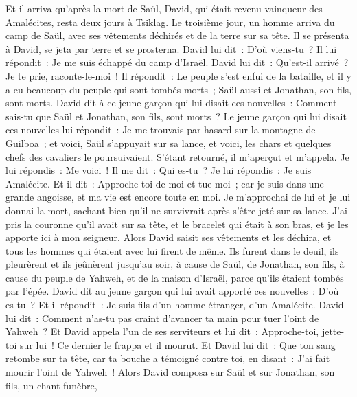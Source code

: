 \begin{multicols}{2}
\VerseOne{}Et il arriva qu'après la mort de Saül, David, qui était revenu vainqueur des Amalécites, resta deux jours à Tsiklag.
Le troisième jour, un homme arriva du camp de Saül, avec ses vêtements déchirés et de la terre sur sa tête. Il se présenta à David, se jeta par terre et se prosterna.
David lui dit~: D'où viens-tu~? Il lui répondit~: Je me suis échappé du camp d'Israël.
David lui dit~: Qu'est-il arrivé~? Je te prie, raconte-le-moi~! Il répondit~: Le peuple s'est enfui de la bataille, et il y a eu beaucoup du peuple qui sont tombés morts~; Saül aussi et Jonathan, son fils, sont morts.
David dit à ce jeune garçon qui lui disait ces nouvelles~: Comment sais-tu que Saül et Jonathan, son fils, sont morts~?
Le jeune garçon qui lui disait ces nouvelles lui répondit~: Je me trouvais par hasard sur la montagne de Guilboa~; et voici, Saül s'appuyait sur sa lance, et voici, les chars et quelques chefs des cavaliers le poursuivaient.
S'étant retourné, il m'aperçut et m'appela. Je lui répondis~: Me voici~!
Il me dit~: Qui es-tu~? Je lui répondis~: Je suis Amalécite.
Et il dit~: Approche-toi de moi et tue-moi~; car je suis dans une grande angoisse, et ma vie est encore toute en moi.
Je m'approchai de lui et je lui donnai la mort, sachant bien qu'il ne survivrait après s'être jeté sur sa lance. J'ai pris la couronne qu'il avait sur sa tête, et le bracelet qui était à son bras, et je les apporte ici à mon seigneur.
Alors David saisit ses vêtements et les déchira, et tous les hommes qui étaient avec lui firent de même.
Ils furent dans le deuil, ils pleurèrent et ils jeûnèrent jusqu'au soir, à cause de Saül, de Jonathan, son fils, à cause du peuple de Yahweh, et de la maison d'Israël, parce qu'ils étaient tombés par l'épée.
David dit au jeune garçon qui lui avait apporté ces nouvelles~: D'où es-tu~? Et il répondit~: Je suis fils d'un homme étranger, d'un Amalécite.
David lui dit~: Comment n'as-tu pas craint d'avancer ta main pour tuer l'oint de Yahweh~?
Et David appela l'un de ses serviteurs et lui dit~: Approche-toi, jette-toi sur lui~! Ce dernier le frappa et il mourut.
Et David lui dit~: Que ton sang retombe sur ta tête, car ta bouche a témoigné contre toi, en disant~: J'ai fait mourir l'oint de Yahweh~!
Alors David composa sur Saül et sur Jonathan, son fils, un chant funèbre,

\end{multicols}
